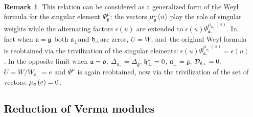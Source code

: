 \documentclass[12pt]{article}
\theoremstyle{definition}
\newtheorem{remark}{Remark}
\newcommand{\gf}{\mathfrak{g}}
\newcommand{\af}{\mathfrak{a}}
\newcommand{\afb}{\mathfrak{a}_{\bot}}
\begin{document}
\bigskip

\begin{remark}
This relation can be considered as a generalized form of the Weyl formula
for the singular element $\Psi _{\gf}^{\mu }$: the vectors $\mu _{%
\widetilde{\mathfrak{a}}}\left( u\right) $ play the role of singular weights
while the alternating factors $\epsilon (u)$ are extended to $\epsilon
(u)\Psi _{\afb}^{\mu _{\afb}\left( u\right) }$. In
fact when $\frak{a=g}$ both $\afb$and $\frak{h}_{\perp }$are
zeros, $U=W$, and\ the original Weyl formula is reobtained via the
trivilization of the singular elements: $\epsilon (u)\Psi _{\afb}^{\mu _{\afb}\left( u\right) }=\epsilon (u)$. In the opposite
limit when $\frak{a=0}$, $\Delta _{\afb}=\Delta _{\gf}$, $%
\frak{h}_{\perp }^{\ast }=0$, $\afb=\gf$, $\mathcal{D}_{%
\afb}=0$, $U=W/W_{\afb}=e$ and $\Psi ^{\mu }$ is
again reobtained, now via the trivilization of the set of vectors: $\mu _{%
\af}\left( e\right) =0$.
\end{remark}

\subsection{Reduction of Verma modules}
\end{document}
